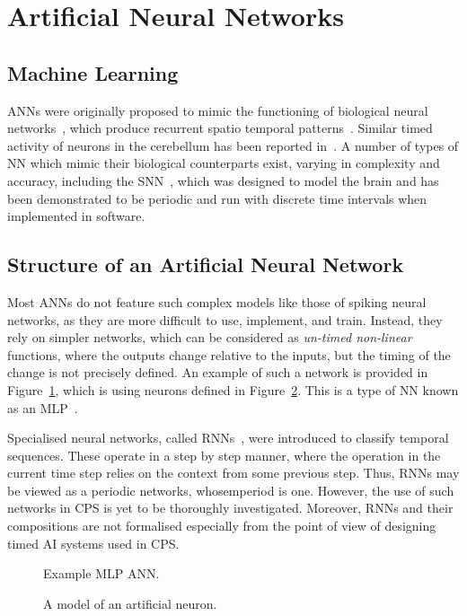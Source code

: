 \section{Artificial Neural Networks}
\subsection{Machine Learning}
\acp{ANN} were originally proposed to mimic the functioning of  biological neural networks~\cite{kohonen1988introduction}, which produce recurrent spatio temporal patterns~\cite{rolston2007precisely}. 
Similar timed activity of neurons in the cerebellum has been reported in~\cite{bullock1994neural, moore1989adaptively}. 
A number of types of \ac{NN} which mimic their biological counterparts exist, varying in complexity and accuracy, including the \ac{SNN}~\cite{izhikevich2003spiking,maass1997spiking}, which was designed to model the brain and has been demonstrated to be periodic and run with discrete time intervals when implemented in software. 

\subsection{Structure of an Artificial Neural Network}
Most \acp{ANN} do not feature such complex models like those of spiking neural networks, as they are more difficult to use, implement, and train. 
Instead, they rely on simpler networks, which can be considered as \emph{un-timed non-linear} functions, where the outputs change relative to the inputs, but the timing of the change is not precisely defined. 
An example of such a network is provided in Figure~\ref{fig:mlp-ann}, which is using neurons defined in Figure~\ref{fig:artificial-neuron}. 
This is a type of \ac{NN} known as an \acf{MLP}~\cite{yegnanarayana1994artificial}.

Specialised neural networks, called \acfp{RNN}~\cite{medsker2001recurrent}, were introduced to classify temporal sequences. 
These operate in a step by step manner, where the operation in the current time step relies on the context from some previous step. Thus, \acp{RNN} may be viewed as a periodic networks, whosemperiod is one. 
However, the use of such networks in \ac{CPS} is yet to be thoroughly investigated. 
Moreover, \acp{RNN} and their compositions are not formalised especially from the point of view of designing timed AI systems used in \ac{CPS}.  

\begin{figure}
	\centering
	\scalebox{0.8}{}
	\caption{Example \ac{MLP} \ac{ANN}.	\label{fig:mlp-ann}}
\end{figure}
\begin{figure}
	\centering
	\scalebox{0.8}{}
	\caption{A model of an artificial neuron. \label{fig:artificial-neuron}}
\end{figure}

